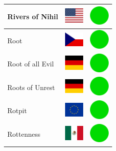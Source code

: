 \documentclass[12pt, a4paper, twoside]{report}
\begin{document}
\begin{center}
\begin{longtable}{|p{5cm}|p{2cm}|p{2cm}|}
 Rivers of Nihil                                            & \includegraphics[width=1cm]{../img/flags/us} &   \includegraphics[width=1cm]{../likes/y} \\ \hline
 Root                                                       & \includegraphics[width=1cm]{../img/flags/cz} &   \includegraphics[width=1cm]{../likes/y} \\ \hline
 Root of all Evil                                           & \includegraphics[width=1cm]{../img/flags/de} &   \includegraphics[width=1cm]{../likes/y} \\ \hline
 Roots of Unrest                                            & \includegraphics[width=1cm]{../img/flags/de} &   \includegraphics[width=1cm]{../likes/y} \\ \hline
 Rotpit                                                     & \includegraphics[width=1cm]{../img/flags/eu} &   \includegraphics[width=1cm]{../likes/y} \\ \hline
 Rottenness                                                 & \includegraphics[width=1cm]{../img/flags/mx} &   \includegraphics[width=1cm]{../likes/y} \\ \hline

\end{longtable}
\end{center}
\end{document}

